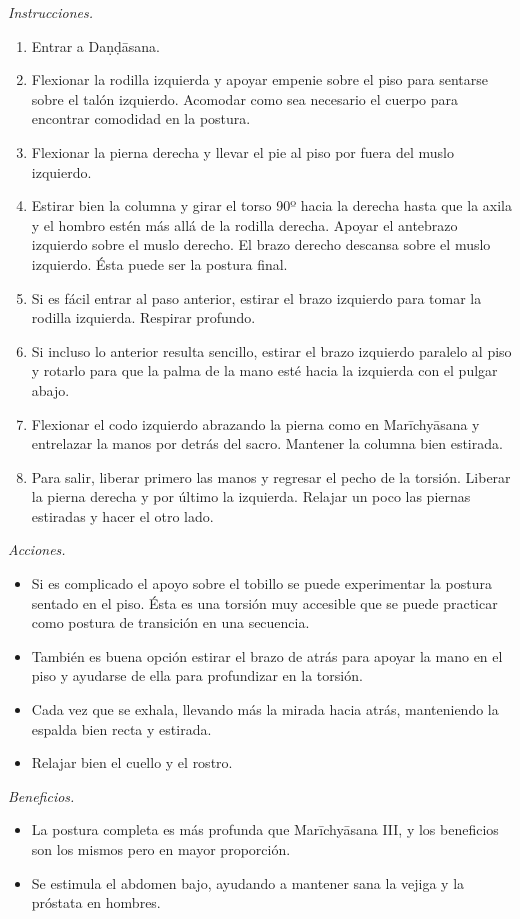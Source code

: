 \emph{Instrucciones.}
\begin{enumerate}
\item Entrar a Daṇḍāsana.
\item Flexionar la rodilla izquierda y apoyar
empenie sobre el piso para sentarse sobre el
talón izquierdo. Acomodar como sea necesario
el cuerpo para encontrar comodidad en la
postura.
\item Flexionar la pierna derecha y llevar el
pie al piso por fuera del muslo izquierdo.
\item Estirar bien la columna y girar el
torso 90º hacia la derecha hasta que la axila
y el hombro estén más allá de la rodilla
derecha. Apoyar el antebrazo izquierdo sobre
el muslo derecho. El brazo derecho descansa
sobre el muslo izquierdo. Ésta puede ser la
postura final.
\item Si es fácil entrar al paso anterior,
estirar el brazo izquierdo para tomar la
rodilla izquierda. Respirar profundo.
\item Si incluso lo anterior resulta
sencillo, estirar el brazo izquierdo paralelo
al piso y rotarlo para que la palma de la
mano esté hacia la izquierda con el pulgar
abajo.
\item Flexionar el codo izquierdo abrazando
la pierna como en Marīchyāsana y entrelazar
la manos por detrás del sacro. Mantener la
columna bien estirada.
\item Para salir, liberar primero las manos y
regresar el pecho de la torsión. Liberar la
pierna derecha y por último la izquierda.
Relajar un poco las piernas estiradas y hacer
el otro lado.
\end{enumerate}

\emph{Acciones.}
\begin{itemize}
\item Si es complicado el apoyo sobre el
tobillo se puede experimentar la postura
sentado en el piso. Ésta es una torsión muy
accesible que se puede practicar como postura
de transición en una secuencia.
\item También es buena opción estirar el
brazo de atrás para apoyar la mano en el piso
y ayudarse de ella para profundizar en la
torsión.
\item Cada vez que se exhala, llevando más la
mirada hacia atrás, manteniendo la espalda
bien recta y estirada.
\item Relajar bien el cuello y el rostro.
\end{itemize}

\emph{Beneficios.}
\begin{itemize}
\item La postura completa es más profunda que
Marīchyāsana III, y los beneficios son los
mismos pero en mayor proporción.
\item Se estimula el abdomen bajo, ayudando a
mantener sana la vejiga y la próstata en
hombres.
\end{itemize}

